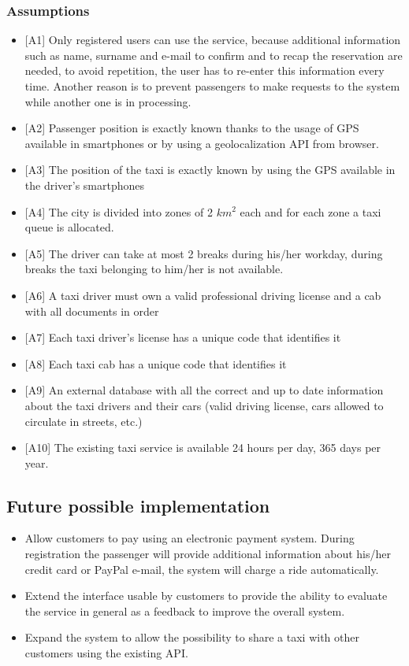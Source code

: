 \documentclass[a4paper,12pt]{article}%
\begin{document}
\subsubsection{Assumptions}
\begin{itemize}
\label{a1} \item {[}A1{]} Only registered users can use the service, because additional information such as name, surname and e-mail to confirm and to recap the reservation are needed, to avoid repetition, the user has to re-enter this information every time.
Another reason is to prevent passengers to make requests to the system while another one is in processing.
\label{a2} \item {[}A2{]} Passenger position is exactly known thanks to the usage of GPS available in smartphones or by using a geolocalization API from browser. 
\label{a3} \item {[}A3{]} The position of the taxi is exactly known by using the GPS available in the driver's smartphones
\label{a4} \item {[}A4{]} The city is divided into zones of 2 $km^2$ each and for each zone a taxi queue is allocated.
\label{a5} \item {[}A5{]} The driver can take at most 2 breaks during his/her workday, during breaks the taxi belonging to him/her is not available.
\label{a6} \item {[}A6{]} A taxi driver must own a valid professional driving license and a cab with all documents in order
\label{a7} \item {[}A7{]} Each taxi driver's license has a unique code that identifies it
\label{a8} \item {[}A8{]} Each taxi cab has a unique code that identifies it
\label{a9} \item {[}A9{]} An external database with all the correct and up to date information about the taxi drivers and their cars (valid driving license, cars allowed to circulate in streets, etc.)
\label{a10} \item {[}A10{]} The existing taxi service is available 24 hours per day, 365 days per year.
\end{itemize}
\subsection{Future possible implementation}
\begin{itemize}
\item Allow customers to pay using an electronic payment system. During registration the passenger will provide additional information about his/her credit card or PayPal e-mail, the system will charge a ride automatically.
\item Extend the interface usable by customers to provide the ability to evaluate the service in general as a feedback to improve the overall system.
\item Expand the system to allow the possibility to share a taxi with other customers using the existing API.
\end{itemize}
\newpage
\end{document}
